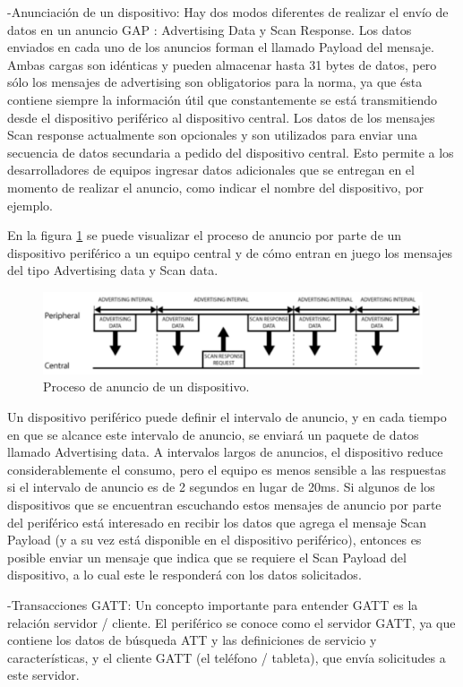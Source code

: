 	-Anunciación de un dispositivo: Hay dos modos diferentes de realizar el envío de datos en un anuncio GAP : Advertising Data y Scan Response. Los datos enviados en cada uno de los anuncios forman el llamado Payload del mensaje. Ambas cargas son idénticas y pueden almacenar hasta 31 bytes de datos, pero sólo los mensajes de
	advertising son obligatorios para la norma, ya que ésta contiene siempre la información útil que constantemente se está transmitiendo desde el dispositivo periférico al dispositivo central. Los datos de los mensajes Scan response actualmente son opcionales y son utilizados para enviar una secuencia de datos secundaria a pedido del dispositivo central. Esto permite a los desarrolladores de equipos ingresar datos adicionales que se entregan en el momento de realizar el anuncio, como indicar el nombre del dispositivo, por ejemplo.

En la figura \ref{advertising} se puede visualizar el proceso de anuncio por parte de un dispositivo periférico a un equipo central y de cómo entran en juego los mensajes del tipo Advertising data y Scan data. 

\begin{figure}[H]
	\centering
	\includegraphics[scale=0.4]{figuras/rn4020/advertising.png}
	\caption{Proceso de anuncio de un dispositivo.}
	\label{advertising}
\end{figure}

Un dispositivo periférico puede definir el intervalo de anuncio, y en cada tiempo en que se alcance este intervalo de anuncio, se enviará un paquete de datos llamado Advertising data. A intervalos largos de anuncios, el dispositivo reduce considerablemente el consumo, pero el equipo es menos sensible a las respuestas si el intervalo de anuncio es de 2 segundos en lugar de 20ms. Si algunos de los dispositivos que se encuentran escuchando estos mensajes de anuncio por parte del periférico está interesado en recibir los datos que agrega el mensaje Scan Payload (y a su vez está disponible en el dispositivo periférico), entonces es posible enviar un mensaje que indica que se requiere el Scan Payload del dispositivo, a lo cual este le responderá con los datos solicitados.

-Transacciones GATT: Un concepto importante para entender GATT es la relación servidor / cliente. El periférico se conoce como el servidor GATT, ya que contiene los datos de búsqueda ATT y las definiciones de servicio y características, y el cliente GATT (el teléfono / tableta), que envía solicitudes a este servidor. 

